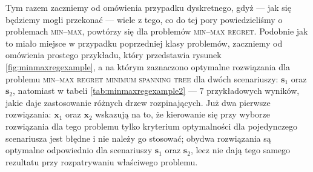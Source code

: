Tym razem zaczniemy od omówienia przypadku dyskretnego, gdyż --- jak się będziemy mogli przekonać --- wiele z tego, co do tej pory powiedzieliśmy o problemach \textsc{min--max}, powtórzy się dla problemów \textsc{min--max regret}. Podobnie jak to miało miejsce w przypadku poprzedniej klasy problemów, zaczniemy od omówienia prostego przykładu, który przedstawia rysunek \ref{fig:minmaxregexample}, a na którym zaznaczono optymalne rozwiązania dla problemu \textsc{min--max regret minimum spanning tree} dla dwóch scenariuszy: $\textbf{s}_{1}$ oraz $\textbf{s}_{2}$, natomiast w tabeli \ref{tab:minmaxregexample2} --- $7$ przykładowych wyników, jakie daje zastosowanie różnych drzew rozpinających. Już dwa pierwsze rozwiązania: $\textbf{x}_{1}$ oraz $\textbf{x}_{2}$ wskazują na to, że kierowanie się przy wyborze rozwiązania dla tego problemu tylko kryterium optymalności dla pojedynczego scenariusza jest błędne i nie należy go stosować; obydwa rozwiązania są optymalne odpowiednio dla scenariuszy $\textbf{s}_{1}$ oraz $\textbf{s}_{2}$, lecz nie dają tego samego rezultatu przy rozpatrywaniu właściwego problemu.

